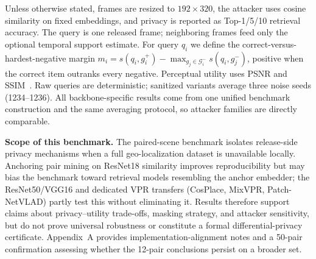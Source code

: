 \documentclass[10pt,journal]{IEEEtran}
\begin{document}

Unless otherwise stated, frames are resized to $192\times 320$, the attacker uses cosine similarity on fixed embeddings, and privacy is reported as Top-1/5/10 retrieval accuracy. The query is one released frame; neighboring frames feed only the optional temporal support estimate. For query $q_i$ we define the correct-versus-hardest-negative margin $m_i=s(q_i,g_i^+)-\max_{g_j\in\mathcal{G}_i^-}s(q_i,g_j^-)$, positive when the correct item outranks every negative. Perceptual utility uses PSNR and SSIM~\cite{wang2004image}. Raw queries are deterministic; sanitized variants average three noise seeds (1234--1236). All backbone-specific results come from one unified benchmark construction and the same averaging protocol, so attacker families are directly comparable.

\textbf{Scope of this benchmark.} The paired-scene benchmark isolates release-side privacy mechanisms when a full geo-localization dataset is unavailable locally. Anchoring pair mining on ResNet18 similarity improves reproducibility but may bias the benchmark toward retrieval models resembling the anchor embedder; the ResNet50/VGG16 and dedicated VPR transfers (CosPlace, MixVPR, Patch-NetVLAD) partly test this without eliminating it. Results therefore support claims about privacy--utility trade-offs, masking strategy, and attacker sensitivity, but do not prove universal robustness or constitute a formal differential-privacy certificate. Appendix~A provides implementation-alignment notes and a 50-pair confirmation assessing whether the 12-pair conclusions persist on a broader set.
\end{document}
